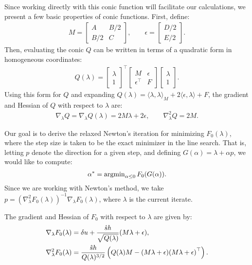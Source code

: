\documentclass{article}
\begin{document}
Since working directly with this conic function will facilitate our
calculations, we present a few basic properties of conic
functions. First, define:
\begin{align*}
  M = \begin{bmatrix} A & B/2 \\ B/2 & C \end{bmatrix}, \qquad \epsilon = \begin{bmatrix} D/2 \\ E/2 \end{bmatrix}.
\end{align*}
Then, evaluating the conic $Q$ can be written in terms of a quadratic
form in homogeneous coordinates:
\begin{align*}
  Q(\lambda) = \begin{bmatrix} \lambda \\ 1 \end{bmatrix}^\top \begin{bmatrix}
    M & \epsilon \\ \epsilon^\top & F \end{bmatrix} \begin{bmatrix} \lambda \\ 1 \end{bmatrix}.
\end{align*}
Using this form for $Q$ and expanding
$Q(\lambda) = \langle \lambda, \lambda \rangle_M + 2 \langle \epsilon,
\lambda \rangle + F$, the gradient and Hessian of $Q$ with respect to
$\lambda$ are:
\begin{align*}
  \nabla_\lambda Q = \nabla_\lambda Q(\lambda) = 2M\lambda + 2\epsilon, \qquad \nabla_\lambda^2 Q = 2M.
\end{align*}

Our goal is to derive the relaxed Newton's iteration for minimizing
$F_0(\lambda)$, where the step size is taken to be the exact minimizer
in the line search. That is, letting $p$ denote the direction for a
given step, and defining $G(\alpha) = \lambda + \alpha p$, we would
like to compute:
\begin{align*}
  \alpha^* = \operatorname{argmin}_{\alpha \leq 0} F_0(G(\alpha)).
\end{align*}
Since we are working with Newton's method, we take
$p = {(\nabla_\lambda^2F_0(\lambda))}^{-1} \nabla_\lambda F_0(\lambda)$,
where $\lambda$ is the current iterate.

\begin{lemma}
  The gradient and Hessian of $F_0$ with respect to $\lambda$ are given
  by:
  \begin{align*}
    \nabla_\lambda F_0(\lambda) &= \delta u + \frac{\hat{s} h}{\sqrt{Q(\lambda)}} {(M\lambda + \epsilon)}, \\
    \nabla_\lambda^2 F_0(\lambda) &= \frac{\hat{s}h}{Q(\lambda)^{3/2}} \left(Q(\lambda) M - {(M\lambda + \epsilon)}{(M\lambda + \epsilon)}^\top\right).
  \end{align*}
\end{lemma}
\end{document}
